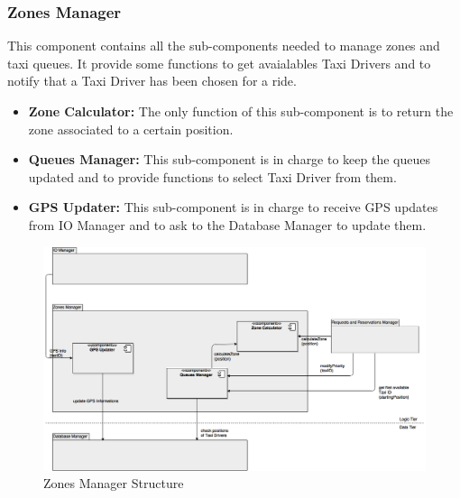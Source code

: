 \documentclass[../../../../../../../dd.tex]{subfiles}
\begin{document}
	\subsubsection{Zones Manager}
		This component contains all the sub-components needed to manage zones and taxi queues.
		It provide some functions to get avaialables Taxi Drivers and to notify that a Taxi Driver has been chosen for a ride.
		\begin{itemize}
			\item \textbf{Zone Calculator:} The only function of this sub-component is to return the zone associated to a certain position.

			\item \textbf{Queues Manager:} This sub-component is in charge to keep the queues updated and to provide functions to select Taxi Driver from them.

			\item \textbf{GPS Updater:} This sub-component is in charge to receive GPS updates from IO Manager and to ask to the Database Manager to update them.
		\end{itemize}

		\begin{figure}[H]
				\centering
				\includegraphics[width=\textwidth, scale=0.5]{../images/ZonesManager.png}
			\caption{Zones Manager Structure}\label{fig:ZonesManager}
		\end{figure}
		
\end{document}
